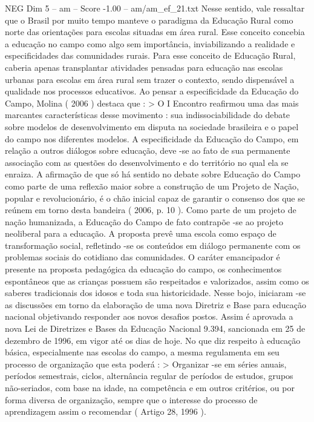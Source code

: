 \begin{textsample}{NEG Dim 5 – am – Score -1.00 – am/am\_ef\_21.txt}
Nesse sentido, vale ressaltar que o Brasil por muito tempo manteve o paradigma da Educação Rural como norte das orientações para escolas situadas em área rural.
Esse conceito concebia a educação no campo como algo sem importância, inviabilizando a realidade e especificidades das comunidades rurais.
Para esse conceito de Educação Rural, caberia apenas transplantar atividades pensadas para educação nas escolas urbanas para escolas em área rural sem trazer o contexto, sendo dispensável a qualidade nos processos educativos.
Ao pensar a especificidade da Educação do Campo, Molina ( 2006 ) destaca que : > O I Encontro reafirmou uma das mais marcantes características desse movimento : sua indissociabilidade do debate sobre modelos de desenvolvimento em disputa na sociedade brasileira e o papel do campo nos diferentes modelos.
A especificidade da Educação do Campo, em relação a outros diálogos sobre educação, deve -se ao fato de sua permanente associação com as questões do desenvolvimento e do território no qual ela se enraiza.
A afirmação de que só há sentido no debate sobre Educação do Campo como parte de uma reflexão maior sobre a construção de um Projeto de Nação, popular e revolucionário, é o chão inicial capaz de garantir o consenso dos que se reúnem em torno desta bandeira ( 2006, p. 10 ).
Como parte de um projeto de nação humanizada, a Educação do Campo de fato contrapõe -se ao projeto neoliberal para a educação.
A proposta prevê uma escola como espaço de transformação social, refletindo -se os conteúdos em diálogo permanente com os problemas sociais do cotidiano das comunidades.
O caráter emancipador é presente na proposta pedagógica da educação do campo, os conhecimentos espontâneos que as crianças possuem são respeitados e valorizados, assim como os saberes tradicionais dos idosos e toda sua historicidade.
Nesse bojo, iniciaram -se as discussões em torno da elaboração de uma nova Diretriz e Base para educação nacional objetivando responder aos novos desafios postos.
Assim é aprovada a nova Lei de Diretrizes e Bases da Educação Nacional 9.394, sancionada em 25 de dezembro de 1996, em vigor até os dias de hoje.
No que diz respeito à educação básica, especialmente nas escolas do campo, a mesma regulamenta em seu processo de organização que esta poderá : > Organizar -se em séries anuais, períodos semestrais, ciclos, alternância regular de períodos de estudos, grupos não-seriados, com base na idade, na competência e em outros critérios, ou por forma diversa de organização, sempre que o interesse do processo de aprendizagem assim o recomendar ( Artigo 28, 1996 ).

\end{textsample}
